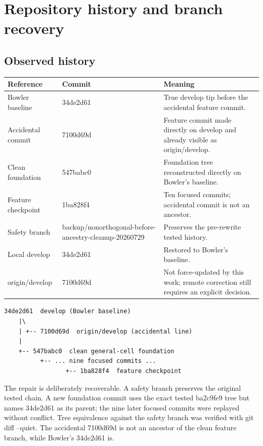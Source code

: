 \documentclass[10pt,a4paper]{report}
\begin{document}
\chapter{Repository history and branch recovery}
\section{Observed history}
\small\begin{longtable}{p{}|p{}|p{}}
\toprule Reference & Commit & Meaning\\ \midrule\endhead
Bowler baseline & 34de2d61 & True develop tip before the accidental feature commit.\\
Accidental commit & 7100d69d & Feature commit made directly on develop and already visible as origin/develop.\\
Clean foundation & 547babc0 & Foundation tree reconstructed directly on Bowler's baseline.\\
Feature checkpoint & 1ba828f4 & Ten focused commits; accidental commit is not an ancestor.\\
Safety branch & backup/nonorthogonal-before-ancestry-cleanup-20260729 & Preserves the pre-rewrite tested history.\\
Local develop & 34de2d61 & Restored to Bowler's baseline.\\
origin/develop & 7100d69d & Not force-updated by this work; remote correction still requires an explicit decision.\\
\bottomrule\end{longtable}\normalsize
\begin{lstlisting}
34de2d61  develop (Bowler baseline)
    |\
    | +-- 7100d69d  origin/develop (accidental line)
    |
    +-- 547babc0  clean general-cell foundation
          +-- ... nine focused commits ...
                 +-- 1ba828f4  feature checkpoint
\end{lstlisting}
The repair is deliberately recoverable. A safety branch preserves the original tested chain. A new foundation commit uses the exact tested ba2c9fe9 tree but names 34de2d61 as its parent; the nine later focused commits were replayed without conflict. Tree equivalence against the safety branch was verified with git diff --quiet. The accidental 7100d69d is not an ancestor of the clean feature branch, while Bowler's 34de2d61 is.
\end{document}
